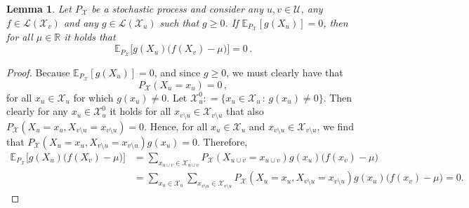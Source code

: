 \documentclass[3p]{elsarticle}
\newtheorem{lemma}[theorem]{Lemma}
\newcommand{\reals}{\mathbb{R}}
\newcommand{\states}{\mathcal{X}}
\newcommand{\gambles}{\mathcal{L}}
\newcommand{\coloneqq}{:\!=}
\begin{document}
\begin{lemma}\label{lemma:conditioning_zero_means_bayes_zero}
Let $P_\states$ be a stochastic process and consider any $u,v\in\mathcal{U}$, any $f\in\gambles(\states_v)$ and any $g\in\gambles(\states_u)$ such that $g\geq 0$. If\/ $\mathbb{E}_{P_\states}[g(X_u)]=0$, then for all $\mu\in\reals$ it holds that
\begin{equation*}
\mathbb{E}_{P_\states}\bigl[g(X_u)\bigl(f(X_v) - \mu\bigr)\bigr]=0\,.
\end{equation*}
\end{lemma}
\begin{proof}
Because $\mathbb{E}_{P_\states}[g(X_u)]=0$, and since $g\geq 0$, we must clearly have that
\begin{equation*}
P_\states(X_u=x_u) = 0\,,
\end{equation*}
for all $x_u\in\states_u$ for which $g(x_u)\neq 0$. Let $\states_u^0\coloneqq\{x_u\in\states_u\,:\,g(x_u)\neq 0\}$. Then clearly for any $x_u\in\states_u^0$ it holds for all $x_{v\setminus u}\in\states_{v\setminus u}$ that also $P_\states(X_u=x_u,X_{v\setminus u}=x_{v\setminus u})=0$. Hence, for all $x_u\in\states_u$ and $x_{v\setminus u}\in\states_{v\setminus u}$, we find that $P_\states(X_u=x_u,X_{v\setminus u}=x_{v\setminus u})g(x_u)=0$. Therefore,
\begin{align*}
\mathbb{E}_{P_\states}\bigl[g(X_u)\bigl(f(X_v) - \mu\bigr)\bigr] &= \sum_{x_{u\cup v}\in\states_{u\cup v}} P_\states(X_{u\cup v}=x_{u\cup v})g(x_u)\bigl(f(x_v) - \mu\bigr) \\
 &= \sum_{x_{u}\in\states_{u}}\sum_{x_{v\setminus u}\in\states_{v\setminus u}} P_\states(X_u=x_u,X_{v\setminus u}=x_{v\setminus u})g(x_u)\bigl(f(x_v) - \mu\bigr)=0. 
\end{align*}
\end{proof}
\end{document}
